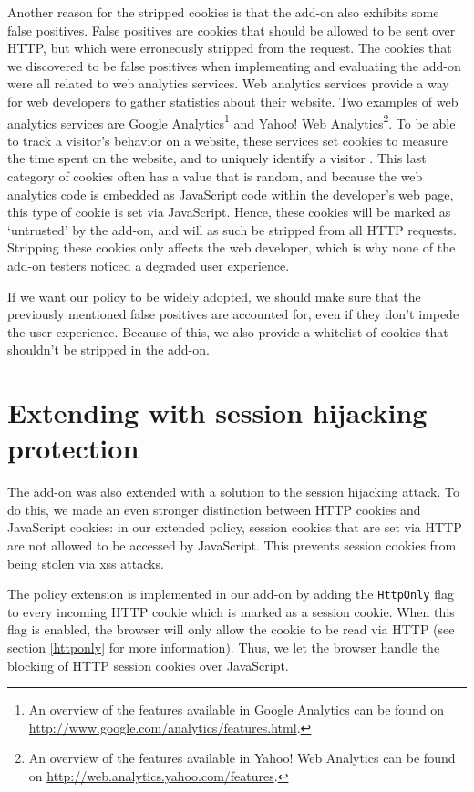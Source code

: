 Another reason for the stripped cookies is that the add-on also exhibits some false positives. False positives are cookies that should be allowed to be sent over HTTP, but which were erroneously stripped from the request. The cookies that we discovered to be false positives when implementing and evaluating the add-on were all related to web analytics services. Web analytics services provide a way for web developers to gather statistics about their website. Two examples of web analytics services are Google Analytics\footnote{An overview of the features available in Google Analytics can be found on \url{http://www.google.com/analytics/features.html}.} and Yahoo! Web Analytics\footnote{An overview of the features available in Yahoo! Web Analytics can be found on \url{http://web.analytics.yahoo.com/features}.}. To be able to track a visitor's behavior on a website, these services set cookies to measure the time spent on the website, and to uniquely identify a visitor \cite{Tappenden2009,GoogleAnalytics}. This last category of cookies often has a value that is random, and because the web analytics code is embedded as JavaScript code within the developer's web page, this type of cookie is set via JavaScript. Hence, these cookies will be marked as `untrusted' by the add-on, and will as such be stripped from all HTTP requests. Stripping these cookies only affects the web developer, which is why none of the add-on testers noticed a degraded user experience.

If we want our policy to be widely adopted, we should make sure that the previously mentioned false positives are accounted for, even if they don't impede the user experience. Because of this, we also provide a whitelist of cookies that shouldn't be stripped in the add-on.

\section{Extending with session hijacking protection}

The add-on was also extended with a solution to the session hijacking attack. To do this, we made an even stronger distinction between HTTP cookies and JavaScript cookies: in our extended policy, session cookies that are set via HTTP are not allowed to be accessed by JavaScript. This prevents session cookies from being stolen via \gls{xss} attacks.

The policy extension is implemented in our add-on by adding the \texttt{HttpOnly} flag to every incoming HTTP cookie which is marked as a session cookie. When this flag is enabled, the browser will only allow the cookie to be read via HTTP (see section \ref{httponly} for more information). Thus, we let the browser handle the blocking of HTTP session cookies over JavaScript.

